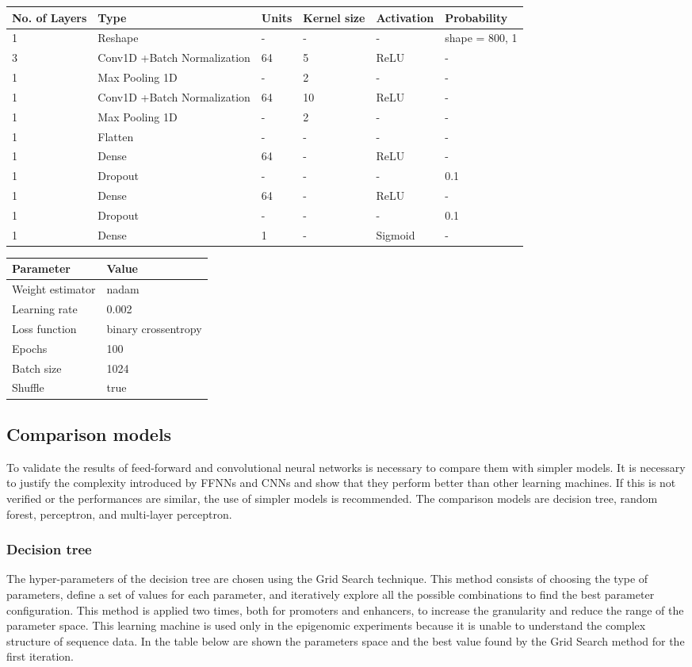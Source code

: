 \begin{longtable}[]{@{}lp{4.2cm}llll@{}}
\toprule
\textbf{No. of Layers} & \textbf{Type} & \textbf{Units} & \textbf{Kernel size} & \textbf{Activation} &
\textbf{Probability}\tabularnewline
\midrule
\endhead
1 & Reshape & - & - & - & shape = 800, 1\tabularnewline
3 & Conv1D +\newline Batch Normalization & 64 & 5 & ReLU & -\tabularnewline
1 & Max Pooling 1D & - & 2 & - & -\tabularnewline
1 & Conv1D +\newline Batch Normalization & 64 & 10 & ReLU & -\tabularnewline
1 & Max Pooling 1D & - & 2 & - & -\tabularnewline
1 & Flatten & - & - & - & -\tabularnewline
1 & Dense & 64 & - & ReLU & -\tabularnewline
1 & Dropout & - & - & - & 0.1\tabularnewline
1 & Dense & 64 & - & ReLU & -\tabularnewline
1 & Dropout & - & - & - & 0.1\tabularnewline
1 & Dense & 1 & - & Sigmoid & -\tabularnewline
\bottomrule
\end{longtable}

\begin{longtable}[]{@{}ll@{}}
\toprule
\textbf{Parameter} & \textbf{Value}\tabularnewline
\midrule
\endhead
Weight estimator & nadam\tabularnewline
Learning rate & 0.002\tabularnewline
Loss function & binary crossentropy\tabularnewline
Epochs & 100\tabularnewline
Batch size & 1024\tabularnewline
Shuffle & true\tabularnewline
\bottomrule
\end{longtable}

\subsection{Comparison models}\label{header-n738}

To validate the results of feed-forward and convolutional neural
networks is necessary to compare them with simpler models. It is
necessary to justify the complexity introduced by FFNNs and CNNs and
show that they perform better than other learning machines. If this is
not verified or the performances are similar, the use of simpler models
is recommended. The comparison models are decision tree, random forest,
perceptron, and multi-layer perceptron.

\subsubsection{Decision tree}\label{header-n740}

The hyper-parameters of the decision tree are chosen using the Grid
Search technique. This method consists of choosing the type of
parameters, define a set of values for each parameter, and iteratively
explore all the possible combinations to find the best parameter
configuration. This method is applied two times, both for promoters and
enhancers, to increase the granularity and reduce the range of the
parameter space. This learning machine is used only in the epigenomic
experiments because it is unable to understand the complex structure of
sequence data. In the table below are shown the parameters space and the
best value found by the Grid Search method for the first iteration.

